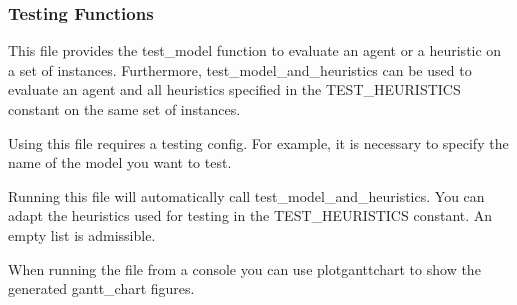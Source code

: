 \documentclass[letterpaper,10pt,english]{sphinxmanual}
\begin{document}
\subsubsection{Testing Functions}
\label{\detokenize{agents.reinforcement_learning:module-agents.test}}\label{\detokenize{agents.reinforcement_learning:testing-functions}}
\sphinxAtStartPar
This file provides the test\_model function to evaluate an agent or a heuristic on a set of instances.
Furthermore, test\_model\_and\_heuristics can be used to evaluate an agent and all heuristics specified in the
TEST\_HEURISTICS constant on the same set of instances.

\sphinxAtStartPar
Using this file requires a testing config. For example, it is necessary to specify the name of the model
you want to test.

\sphinxAtStartPar
Running this file will automatically call test\_model\_and\_heuristics.
You can adapt the heuristics used for testing in the TEST\_HEURISTICS constant. An empty list is admissible.

\sphinxAtStartPar
When running the file from a console you can use \textendash{}plot\sphinxhyphen{}ganttchart to show the generated gantt\_chart figures.
\end{document}
